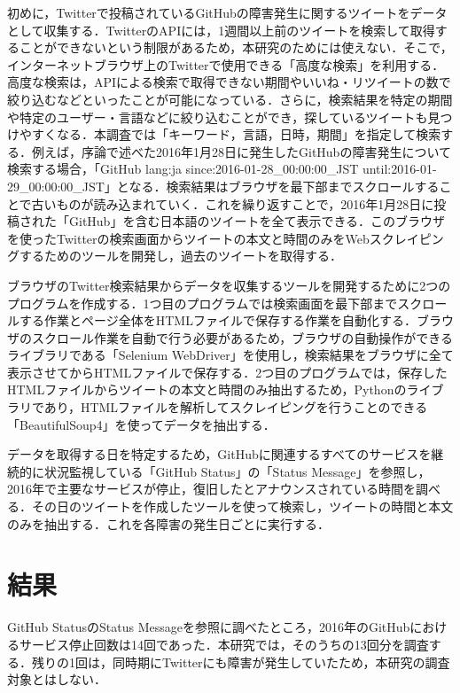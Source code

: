 \documentclass[uplatex,twocolumn]{jsarticle}
\begin{document}
初めに，Twitterで投稿されているGitHubの障害発生に関するツイートをデータとして収集する．TwitterのAPIには，1週間以上前のツイートを検索して取得することができないという制限があるため，本研究のためには使えない\cite{02}．そこで，インターネットブラウザ上のTwitterで使用できる「高度な検索」を利用する．高度な検索は，APIによる検索で取得できない期間やいいね・リツイートの数で絞り込むなどといったことが可能になっている．さらに，検索結果を特定の期間や特定のユーザー・言語などに絞り込むことができ，探しているツイートも見つけやすくなる．本調査では「キーワード，言語，日時，期間」を指定して検索する．例えば，序論で述べた2016年1月28日に発生したGitHubの障害発生について検索する場合，「GitHub lang:ja since:2016-01-28\_00:00:00\_JST until:2016-01-29\_00:00:00\_JST」となる．検索結果はブラウザを最下部までスクロールすることで古いものが読み込まれていく．これを繰り返すことで，2016年1月28日に投稿された「GitHub」を含む日本語のツイートを全て表示できる．このブラウザを使ったTwitterの検索画面からツイートの本文と時間のみをWebスクレイピングするためのツールを開発し，過去のツイートを取得する．

ブラウザのTwitter検索結果からデータを収集するツールを開発するために2つのプログラムを作成する．1つ目のプログラムでは検索画面を最下部までスクロールする作業とページ全体をHTMLファイルで保存する作業を自動化する．ブラウザのスクロール作業を自動で行う必要があるため，ブラウザの自動操作ができるライブラリである「Selenium WebDriver」を使用し，検索結果をブラウザに全て表示させてからHTMLファイルで保存する．2つ目のプログラムでは，保存したHTMLファイルからツイートの本文と時間のみ抽出するため，Pythonのライブラリであり，HTMLファイルを解析してスクレイピングを行うことのできる「BeautifulSoup4」を使ってデータを抽出する．

データを取得する日を特定するため，GitHubに関連するすべてのサービスを継続的に状況監視している「GitHub Status」の「Status Message」を参照し，2016年で主要なサービスが停止，復旧したとアナウンスされている時間を調べる．その日のツイートを作成したツールを使って検索し，ツイートの時間と本文のみを抽出する．これを各障害の発生日ごとに実行する．

\section{結果}
GitHub StatusのStatus Messageを参照に調べたところ，2016年のGitHubにおけるサービス停止回数は14回であった．本研究では，そのうちの13回分を調査する．残りの1回は，同時期にTwitterにも障害が発生していたため，本研究の調査対象とはしない．
\end{document}
